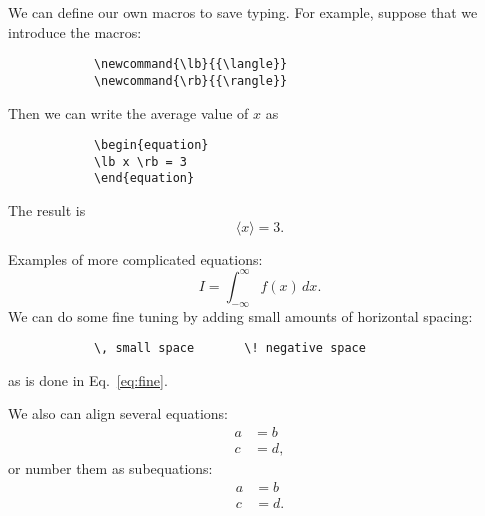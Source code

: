 \documentclass[12pt]{article}
\begin{document}
			We can define our own macros to save typing. For example, suppose
			that we introduce the macros:
			\begin{verbatim}
			\newcommand{\lb}{{\langle}}
			\newcommand{\rb}{{\rangle}}
			\end{verbatim}
			\newcommand{\lb}{{\langle}}
			\newcommand{\rb}{{\rangle}}
			Then we can write the average value of $x$ as
			\begin{verbatim}
			\begin{equation}
			\lb x \rb = 3
			\end{equation}
			\end{verbatim}
			The result is
			\begin{equation}
			\lb x \rb = 3 .
			\end{equation}

			Examples of more complicated equations:
			\begin{equation}
			I = \! \int_{-\infty}^\infty f(x)\,dx \label{eq:fine}.
			\end{equation}
			We can do some fine tuning by adding small amounts of horizontal
			spacing:
			\begin{verbatim}
			\, small space       \! negative space
			\end{verbatim}
			as is done in Eq.~\eqref{eq:fine}.

			We also can align several equations:
			\begin{align}
			a & = b \\
			      c &= d ,
			\end{align}
			or number them as subequations:
			\begin{subequations}
			\begin{align}
			a & = b \\
			      c &= d .
			      \end{align}
			      \end{subequations}
\end{document}
